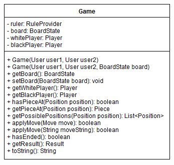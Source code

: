 \documentclass[parskip=full]{scrartcl}
\begin{document}
		\begin{minipage}{\linewidth}
			\centering
			\includegraphics[width=1\linewidth]{Diagramme/Game}
			\label{fig:game}
		\end{minipage}
\end{document}
